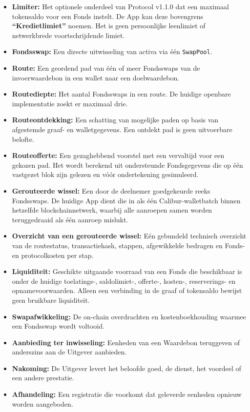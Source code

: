 \documentclass[11pt]{article}
\begin{document}
\begin{itemize}[leftmargin=*]
\item \textbf{Limiter:} Het optionele onderdeel van Protocol v1.1.0 dat een maximaal tokensaldo voor een Fonds instelt. De App kan deze bovengrens \textbf{``Kredietlimiet''} noemen. Het is geen persoonlijke leenlimiet of netwerkbrede voortschrijdende limiet.
\item \textbf{Fondsswap:} Een directe uitwisseling van activa via één \texttt{SwapPool}.
\item \textbf{Route:} Een geordend pad van één of meer Fondsswaps van de invoerwaardebon in een wallet naar een doelwaardebon.
\item \textbf{Routediepte:} Het aantal Fondsswaps in een route. De huidige openbare implementatie zoekt er maximaal drie.
\item \textbf{Routeontdekking:} Een schatting van mogelijke paden op basis van afgestemde graaf- en walletgegevens. Een ontdekt pad is geen uitvoerbare belofte.
\item \textbf{Routeofferte:} Een gezaghebbend voorstel met een vervaltijd voor een gekozen pad. Het wordt berekend uit ondersteunde Fondsgegevens die op één vastgezet blok zijn gelezen en vóór ondertekening gesimuleerd.
\item \textbf{Gerouteerde wissel:} Een door de deelnemer goedgekeurde reeks Fondsswaps. De huidige App dient die in als één Calibur-walletbatch binnen hetzelfde blockchainnetwerk, waarbij alle aanroepen samen worden teruggedraaid als één aanroep mislukt.
\item \textbf{Overzicht van een gerouteerde wissel:} Eén gebundeld technisch overzicht van de routestatus, transactiehash, stappen, afgewikkelde bedragen en Fonds- en protocolkosten per stap.
\item \textbf{Liquiditeit:} Geschikte uitgaande voorraad van een Fonds die beschikbaar is onder de huidige toelatings-, saldolimiet-, offerte-, kosten-, reserverings- en opnamevoorwaarden. Alleen een verbinding in de graaf of tokensaldo bewijst geen bruikbare liquiditeit.
\item \textbf{Swapafwikkeling:} De on-chain overdrachten en kostenboekhouding waarmee een Fondsswap wordt voltooid.
\item \textbf{Aanbieding ter inwisseling:} Eenheden van een Waardebon teruggeven of anderszins aan de Uitgever aanbieden.
\item \textbf{Nakoming:} De Uitgever levert het beloofde goed, de dienst, het voordeel of een andere prestatie.
\item \textbf{Afhandeling:} Een registratie die voorkomt dat geleverde eenheden opnieuw worden aangeboden.

\end{itemize}
\end{document}
